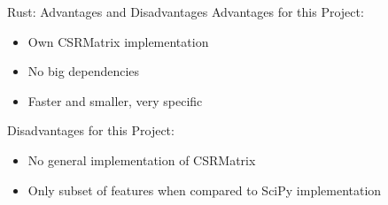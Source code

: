 \begin{frame}[c]{Rust: Advantages and Disadvantages}
    Advantages for this Project:
    \begin{itemize}[<+(1)->]
        \item Own CSRMatrix implementation
        \item No big dependencies
        \item Faster and smaller, very specific
    \end{itemize}
    \pause
    Disadvantages for this Project:
    \begin{itemize}[<+(1)->]
        \item No general implementation of CSRMatrix
        \item Only subset of features when compared to SciPy implementation
    \end{itemize}
\end{frame}



